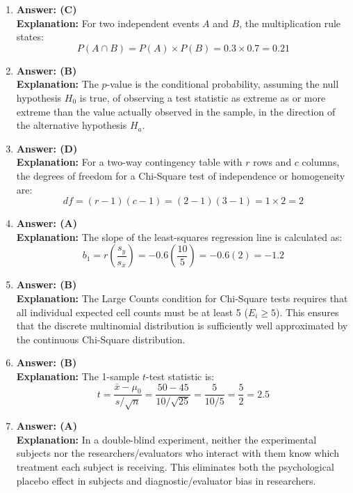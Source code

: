 \begin{enumerate}[leftmargin=1.5em]
  \item \textbf{Answer: (C)} \\
  \textbf{Explanation:} For two independent events $A$ and $B$, the multiplication rule states:
  \[ P(A \cap B) = P(A) \times P(B) = 0.3 \times 0.7 = 0.21 \]

  \item \textbf{Answer: (B)} \\
  \textbf{Explanation:} The $p$-value is the conditional probability, assuming the null hypothesis $H_0$ is true, of observing a test statistic as extreme as or more extreme than the value actually observed in the sample, in the direction of the alternative hypothesis $H_a$.

  \item \textbf{Answer: (D)} \\
  \textbf{Explanation:} For a two-way contingency table with $r$ rows and $c$ columns, the degrees of freedom for a Chi-Square test of independence or homogeneity are:
  \[ df = (r - 1)(c - 1) = (2 - 1)(3 - 1) = 1 \times 2 = 2 \]

  \item \textbf{Answer: (A)} \\
  \textbf{Explanation:} The slope of the least-squares regression line is calculated as:
  \[ b_1 = r \left(\frac{s_y}{s_x}\right) = -0.6 \left(\frac{10}{5}\right) = -0.6(2) = -1.2 \]

  \item \textbf{Answer: (B)} \\
  \textbf{Explanation:} The Large Counts condition for Chi-Square tests requires that all individual expected cell counts must be at least 5 ($E_i \ge 5$). This ensures that the discrete multinomial distribution is sufficiently well approximated by the continuous Chi-Square distribution.

  \item \textbf{Answer: (B)} \\
  \textbf{Explanation:} The 1-sample $t$-test statistic is:
  \[ t = \frac{\bar{x} - \mu_0}{s / \sqrt{n}} = \frac{50 - 45}{10 / \sqrt{25}} = \frac{5}{10 / 5} = \frac{5}{2} = 2.5 \]

  \item \textbf{Answer: (A)} \\
  \textbf{Explanation:} In a double-blind experiment, neither the experimental subjects nor the researchers/evaluators who interact with them know which treatment each subject is receiving. This eliminates both the psychological placebo effect in subjects and diagnostic/evaluator bias in researchers.


\end{enumerate}
